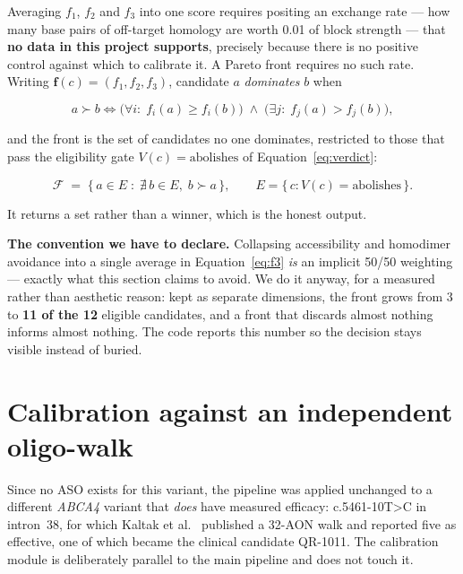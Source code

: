 \documentclass[11pt,a4paper]{article}
\begin{document}
Averaging $f_1$, $f_2$ and $f_3$ into one score requires positing an exchange rate --- how many base
pairs of off-target homology are worth 0.01 of block strength --- that \textbf{no data in this
project supports}, precisely because there is no positive control against which to calibrate it. A
Pareto front requires no such rate. Writing $\bm{f}(c) = (f_1,f_2,f_3)$, candidate $a$
\emph{dominates} $b$ when

\begin{equation}
a \succ b
\iff
\bigl(\forall i:\; f_i(a) \ge f_i(b)\bigr)
\;\wedge\;
\bigl(\exists j:\; f_j(a) > f_j(b)\bigr),
\label{eq:dominance}
\end{equation}

and the front is the set of candidates no one dominates, restricted to those that pass the
eligibility gate $V(c)=\text{abolishes}$ of Equation~\ref{eq:verdict}:

\begin{equation}
\mathcal{F} \;=\; \bigl\{\, a \in E \;:\; \nexists\, b \in E,\; b \succ a \,\bigr\},
\qquad
E = \{\,c : V(c) = \text{abolishes}\,\}.
\label{eq:front}
\end{equation}

It returns a set rather than a winner, which is the honest output.

\textbf{The convention we have to declare.} Collapsing accessibility and homodimer avoidance into a
single average in Equation~\ref{eq:f3} \emph{is} an implicit 50/50 weighting --- exactly what this
section claims to avoid. We do it anyway, for a measured rather than aesthetic reason: kept as
separate dimensions, the front grows from 3 to \textbf{11 of the 12} eligible candidates, and a
front that discards almost nothing informs almost nothing. The code reports this number so the
decision stays visible instead of buried.

\section{Calibration against an independent oligo-walk}
\label{sec:calibration}

Since no ASO exists for this variant, the pipeline was applied unchanged to a different \emph{ABCA4}
variant that \emph{does} have measured efficacy: c.5461-10T>C in intron~38, for which Kaltak et
al.~\cite{kaltak2023} published a 32-AON walk and reported five as effective, one of which became
the clinical candidate QR-1011. The calibration module is deliberately parallel to the main
pipeline and does not touch it.
\end{document}
